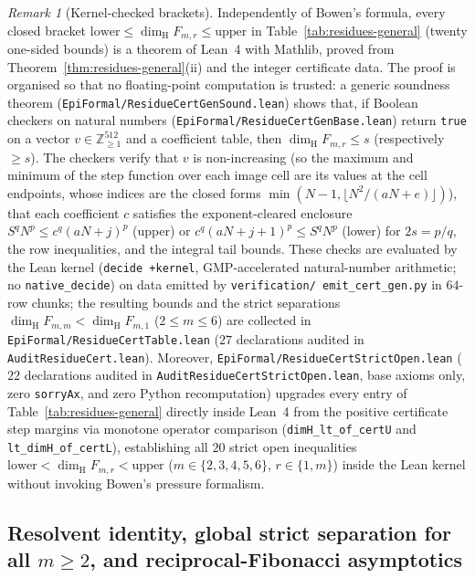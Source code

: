 \documentclass[11pt]{article}
\theoremstyle{definition}
\theoremstyle{remark}
\newtheorem{remark}[theorem]{Remark}
\newcommand{\Z}{\mathbb{Z}}
\newcommand{\dimH}{\dim_{\mathrm{H}}}
\begin{document}
\begin{remark}[Kernel-checked brackets]\label{rem:residue-kernel}
Independently of Bowen's formula, every closed bracket
$\mathrm{lower}\le\dimH F_{m,r}\le\mathrm{upper}$ in Table~\ref{tab:residues-general}
(twenty one-sided bounds) is a theorem of Lean~4 with Mathlib, proved from
Theorem~\ref{thm:residues-general}(ii) and the integer certificate data. The proof is
organised so that no floating-point computation is trusted: a generic soundness theorem
(\texttt{EpiFormal/\allowbreak ResidueCertGenSound.lean}) shows that, if Boolean checkers on
natural numbers (\texttt{EpiFormal/\allowbreak ResidueCertGenBase.lean}) return \texttt{true}
on a vector $v\in\Z_{\ge1}^{512}$ and a coefficient table, then $\dimH F_{m,r}\le s$
(respectively $\ge s$). The checkers verify that $v$ is non-increasing (so the maximum and
minimum of the step function over each image cell are its values at the cell endpoints,
whose indices are the closed forms $\min(N-1,\lfloor N^2/(aN+e)\rfloor)$), that each
coefficient $c$ satisfies the exponent-cleared enclosure
$S^qN^p\le c^q(aN+j)^p$ (upper) or $c^q(aN+j+1)^p\le S^qN^p$ (lower) for $2s=p/q$, the
row inequalities, and the integral tail bounds. These checks are evaluated by the Lean
kernel (\texttt{decide +kernel}, GMP-accelerated natural-number arithmetic; no
\texttt{native\_decide}) on data emitted by \texttt{verification/\allowbreak
emit\_cert\_gen.py} in $64$-row chunks; the resulting bounds and the strict separations
$\dimH F_{m,m}<\dimH F_{m,1}$ ($2\le m\le6$) are collected in
\texttt{EpiFormal/\allowbreak ResidueCertTable.lean} ($27$ declarations audited in \texttt{AuditResidueCert.lean}). Moreover, \texttt{EpiFormal/\allowbreak ResidueCertStrictOpen.lean} ($22$ declarations audited in \texttt{AuditResidueCertStrictOpen.lean}, base axioms only, zero \texttt{sorryAx}, and zero Python recomputation) upgrades every entry of Table~\ref{tab:residues-general} directly inside Lean~4 from the positive certificate step margins via monotone operator comparison (\texttt{dimH\_lt\_of\_certU} and \texttt{lt\_dimH\_of\_certL}), establishing all $20$ strict open inequalities $\mathrm{lower}<\dimH F_{m,r}<\mathrm{upper}$ ($m\in\{2,3,4,5,6\}$, $r\in\{1,m\}$) inside the Lean kernel without invoking Bowen's pressure formalism.
\end{remark}


\subsection{Resolvent identity, global strict separation for all \texorpdfstring{$m\ge2$}{m >= 2}, and reciprocal-Fibonacci asymptotics}\label{sec:residues-asymptotic}
\end{document}
